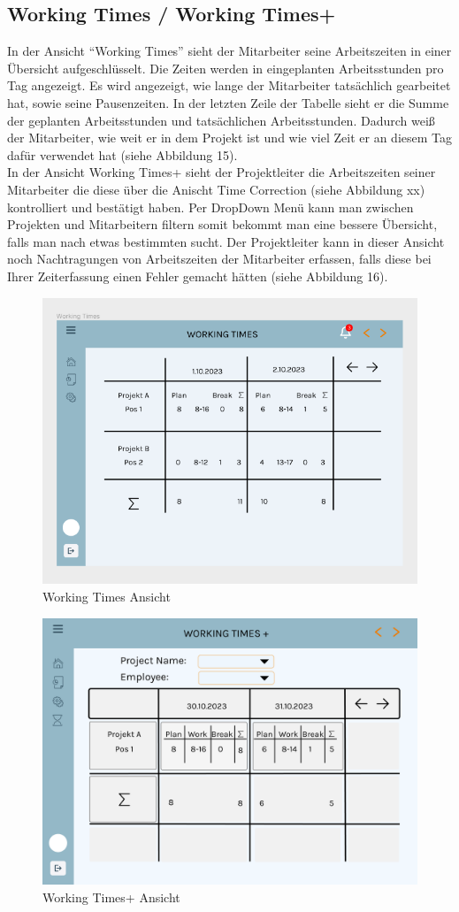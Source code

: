 \documentclass{article}
\begin{document}
\subsection{Working Times / Working Times+}
In der Ansicht “Working Times” sieht der Mitarbeiter seine Arbeitszeiten in
einer Übersicht aufgeschlüsselt. Die Zeiten werden in eingeplanten
Arbeitsstunden pro Tag angezeigt. Es wird angezeigt, wie lange der Mitarbeiter
tatsächlich gearbeitet hat, sowie seine Pausenzeiten. In der letzten Zeile der
Tabelle sieht er die Summe der geplanten Arbeitsstunden und tatsächlichen
Arbeitsstunden. Dadurch weiß der Mitarbeiter, wie weit er in dem Projekt ist
und wie viel Zeit er an diesem Tag dafür verwendet hat (siehe Abbildung 15). \\
In der Ansicht Working Times+ sieht der Projektleiter die Arbeitszeiten seiner
Mitarbeiter die diese über die Anischt Time Correction (siehe Abbildung xx)
kontrolliert und bestätigt haben. Per DropDown Menü kann man zwischen Projekten
und Mitarbeitern filtern somit bekommt man eine bessere Übersicht, falls man
nach etwas bestimmten sucht. Der Projektleiter kann in dieser Ansicht noch
Nachtragungen von Arbeitszeiten der Mitarbeiter erfassen, falls diese bei Ihrer
Zeiterfassung einen Fehler gemacht hätten (siehe Abbildung 16).

\begin{figure}[]
    \includegraphics[height= 0.5\textwidth,width= \textwidth]{images/Working Times.png}
    \caption{Working Times Ansicht}
    \label{fig:beispiel}
\end{figure}

\begin{figure}[]
    \includegraphics[height= 0.5\textwidth,width= \textwidth]{images/Working Times+.png}
    \caption{Working Times+ Ansicht}
    \label{fig:beispiel}
\end{figure}
\end{document}
